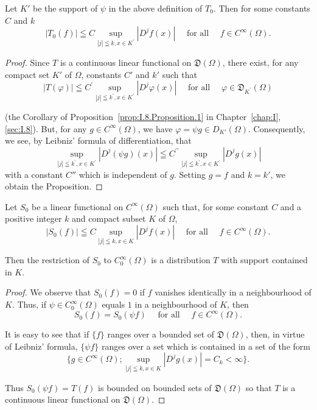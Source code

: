 \begin{proposition}\label{prop:I.13.Proposition.4} Let $K'$ be the support of $\psi$ in the above definition of $T_0$. Then for some constants $C$ and $k$ 
\[
\left| T_{0} (f) \right| \leqq C \sup\limits_ {| j | \leqq k, x \in K ^{\prime}} \left| D ^{j} f (x) \right| \quad \text{ for all } \quad f \in C ^{\infty} (\Omega).
\]
\end{proposition}

\begin{proof}
 Since $T$ is a continuous linear functional on $\mathfrak{D}(\Omega)$, there exist, for any compact set $K'$ of $\Omega$, constants $C'$ and $k'$ such that 
\[
\left| T (\varphi) \right| \leqq C ^{\prime} \sup\limits_ {| j | \leqq k ^{\prime}, x \in K ^{\prime}} \left| D ^{j} \varphi (x) \right| \quad \text{ for all } \quad \varphi \in \mathfrak {D}_ {K ^{\prime}} (\Omega) \]

(the Corollary of Proposition~\ref{prop:I.8.Proposition.1} in Chapter~\ref{chap:I}, \ref{sec:I.8}). But, for any $g \in C^{\infty}(\Omega)$, we have $\varphi = \psi g \in D_{K'}(\Omega)$. Consequently, we see, by Leibniz' formula of differentiation, that 
\[
\sup\limits_ {| j | \leqq k ^{\prime}, x \in K ^{\prime}} | D ^{j} (\psi g) (x) | \leqq C ^{\prime \prime} \sup\limits_ {| j | \leqq k ^{\prime}, x \in K ^{\prime}} | D ^{j} g (x) |
\]
with a constant $C''$ which is independent of $g$. Setting $g = f$ and $k = k'$, we obtain the Proposition. 
\end{proof}

\begin{proposition}\label{prop:I.13.Proposition.5} Let $S_0$ be a linear functional on $C^\infty(\Omega)$ such that, for some constant $C$ and a positive integer $k$ and compact subset $K$ of $\Omega$, 
\[
\left| S_{0} (f) \right| \leqq C \sup\limits_{| j | \leqq k, x \in K} \left| D ^{j} f (x) \right| \quad \text{ for all } \quad f \in C ^{\infty} (\Omega).
\]
\end{proposition}

Then the restriction of $S_{0}$ to $C_{0}^{\infty}(\Omega)$ is a distribution $T$ with support contained in $K$. 

\begin{proof}
 We observe that $S_0(f) = 0$ if $f$ vanishes identically in a neighbourhood of $K$. Thus, if $\psi \in C_0^\infty(\Omega)$ equals $1$ in a neighbourhood of $K$, then 
\[
S_{0} (f) = S_{0} (\psi f) \quad \text{ for all } \quad f \in C ^{\infty} (\Omega). \]

It is easy to see that if $\{f\}$ ranges over a bounded set of $\mathfrak{D}(\Omega)$, then, in virtue of Leibniz' formula, $\{\psi f\}$ ranges over a set which is contained in a set of the form 
\[
\{g \in C ^{\infty} (\Omega); \sup\limits_{| j | \leqq k, x \in K} | D ^{j} g (x) | = C_{k} < \infty \}.
\]

Thus $S_0(\psi f) = T(f)$ is bounded on bounded sets of $\mathfrak{D}(\Omega)$ so that $T$ is a continuous linear functional on $\mathfrak{D}(\Omega)$. 
\end{proof}

